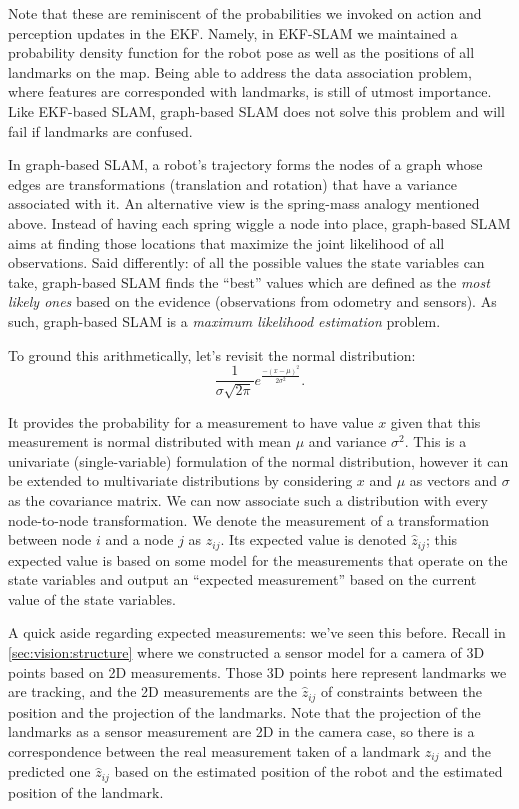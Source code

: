 \noindent Note that these are reminiscent of the probabilities we invoked on action and perception updates in the EKF. Namely, in EKF-SLAM we maintained a probability density function for the robot pose as well as the positions of all landmarks on the map. Being able to address the data association problem, where features are corresponded with landmarks, is still of utmost importance. Like EKF-based SLAM, graph-based SLAM does not solve this problem and will fail if landmarks are confused.

In graph-based SLAM, a robot's trajectory forms the nodes of a graph whose edges are transformations (translation and rotation) that have a variance associated with it. An alternative view is the spring-mass analogy mentioned above. Instead of having each spring wiggle a node into place, graph-based SLAM aims at finding those locations that maximize the joint likelihood of all observations. Said differently: of all the possible values the state variables can take, graph-based SLAM finds the ``best'' values which are defined as the \emph{most likely ones} based on the evidence (observations from odometry and sensors). As such, graph-based SLAM is a \emph{maximum likelihood estimation} problem.

To ground this arithmetically, let's revisit the normal distribution:
\begin{equation}
\frac{1}{\sigma\sqrt{2\pi}}e^{\frac{-(x-\mu)^2}{2\sigma^2}}.
\label{eq:pdf_typical}
\end{equation}

It provides the probability for a measurement to have value $ x$ given that this measurement is normal distributed with mean $ \mu$ and variance $ \sigma^2$. This is a univariate (single-variable) formulation of the normal distribution, however it can be extended to multivariate distributions by considering $x$ and $\mu$ as vectors and $\sigma$ as the covariance matrix. We can now associate such a distribution with every node-to-node transformation. We denote the measurement of a transformation between node $i$ and a node $j$ as $ z_{ij}$. Its expected value is denoted $ \hat{z}_{ij}$; this expected value is based on some model for the measurements that operate on the state variables and output an ``expected measurement'' based on the current value of the state variables.

A quick aside regarding expected measurements: we've seen this before. Recall in \cref{sec:vision:structure} where we constructed a sensor model for a camera of 3D points based on 2D measurements. Those 3D points here represent landmarks we are tracking, and the 2D measurements are the $\hat{z}_{ij}$ of constraints between the position and the projection of the landmarks. Note that the projection of the landmarks as a sensor measurement are 2D in the camera case, so there is a correspondence between the real measurement taken of a landmark $z_{ij}$ and the predicted one $\hat{z}_{ij}$ based on the estimated position of the robot and the estimated position of the landmark.

